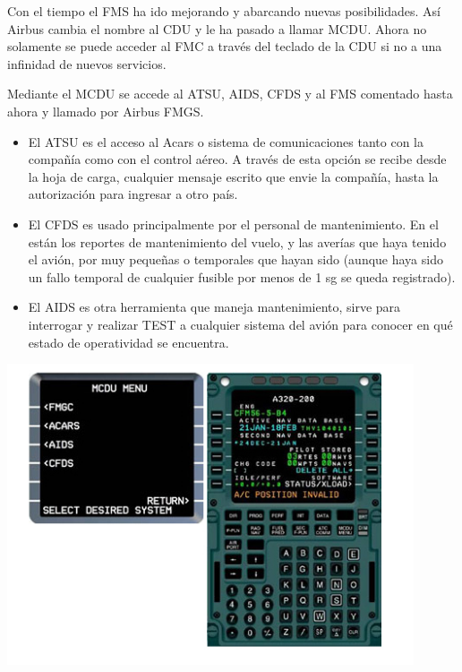 \begin{frame}

{\small
Con el tiempo el \ac{FMS} ha ido mejorando y abarcando nuevas posibilidades. As\'i Airbus cambia el nombre 
al \ac{CDU} y le ha pasado a llamar \ac{MCDU}. Ahora no solamente se puede acceder 
al \ac{FMC} a trav\'es del teclado de la \ac{CDU} si no a una infinidad de nuevos servicios.

Mediante el \ac{MCDU} se accede al \ac{ATSU}, \ac{AIDS}, \ac{CFDS} y al \ac{FMS} 
comentado hasta ahora y llamado por Airbus \ac{FMGS}.

\begin{itemize}
\item El \ac{ATSU} es el acceso al Acars o sistema de comunicaciones
  tanto con la compa\~n\'ia como con el control a\'ereo. A trav\'es de
  esta opci\'on se recibe desde la hoja de carga, cualquier mensaje
  escrito que envie la compa\~n\'ia, hasta la autorizaci\'on para
  ingresar a otro pa\'is.

\item   El \ac{CFDS} es usado principalmente por el personal de
  mantenimiento.  En el est\'an los reportes de mantenimiento del
  vuelo, y las aver\'ias que haya tenido el avi\'on, por muy
  peque\~nas o temporales que hayan sido (aunque haya sido un fallo
  temporal de cualquier fusible por menos de 1 sg se queda
  registrado).

\item   El \ac{AIDS} es otra herramienta que maneja mantenimiento, sirve
  para interrogar y realizar TEST a cualquier sistema del avi\'on para
  conocer en qu\'e estado de operatividad se encuentra.
\end{itemize}


}
\end{frame}

\begin{frame}

    \includegraphics[width=0.9\textwidth]{imagenes/1.4.pantalla.electronica/mcdu.jpg}

\end{frame}

